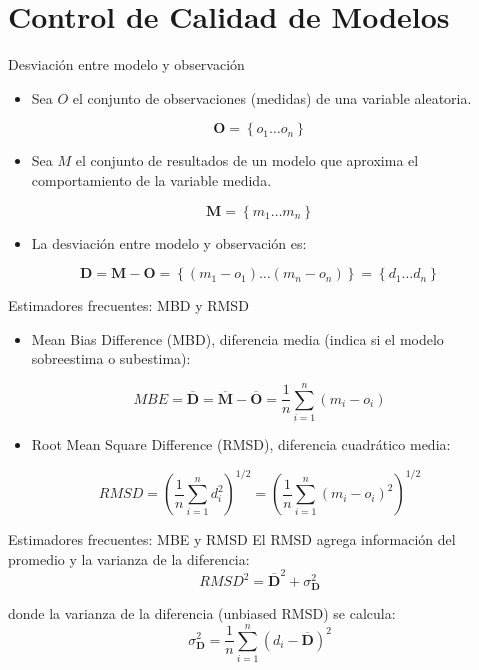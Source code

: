 \documentclass[aspectratio=169, usenames,svgnames,dvipsnames]{beamer}
\begin{document}
\section{Control de Calidad de Modelos}
\label{sec:orgcbf6d1d}

\begin{frame}[label={sec:orgeed4299}]{Desviación entre modelo y observación}
\begin{itemize}
\item Sea \(O\) el conjunto de observaciones (medidas) de una variable aleatoria.
\end{itemize}

\[
\mathbf{O} = \left\{ o_1 \dots o_n \right\}
\]
\begin{itemize}
\item Sea \(M\) el conjunto de resultados de un modelo que aproxima el comportamiento de la variable medida.
\end{itemize}

\[
\mathbf{M} = \left\{ m_1 \dots m_n  \right\}
\]

\begin{itemize}
\item La desviación entre modelo y observación es:
\end{itemize}

\[
\mathbf{D} = \mathbf{M} - \mathbf{O} =  \left\{ (m_1 - o_1) \dots (m_n - o_n)  \right\} = \left\{ d_1 \dots d_n  \right\}
\]
\end{frame}

\begin{frame}[label={sec:orgd8e8cb5}]{Estimadores frecuentes: MBD y RMSD}
\begin{itemize}
\item Mean Bias Difference (MBD), diferencia media (indica si el modelo sobreestima o subestima):
\end{itemize}
\[
MBE = \overline{\mathbf{D}} = \overline{\mathbf{M}} - \overline{\mathbf{O}} = \frac{1}{n} \sum_{i=1}^n (m_i - o_i)
\]

\begin{itemize}
\item Root Mean Square Difference (RMSD), diferencia cuadrático media:
\end{itemize}
\[
RMSD = \left(\frac{1}{n} \sum_{i=1}^n d_i^2 \right)^{1/2} =  \left( \frac{1}{n} \sum_{i=1}^n (m_i - o_i)^2  \right)^{1/2}
\]
\end{frame}

\begin{frame}[label={sec:org381a15b}]{Estimadores frecuentes: MBE y RMSD}
El RMSD agrega información del promedio y la varianza de la
  diferencia:
\[
RMSD^2= \overline{\mathbf{D}}^2 + \sigma^2_{\mathbf{D}} 
\]

donde la varianza de la diferencia (unbiased RMSD) se calcula:
\[
\sigma^2_{\mathbf{D}} = \frac{1}{n} \sum_{i=1}^n (d_i - \overline{\mathbf{D}})^2
\]
\end{frame}
\end{document}
